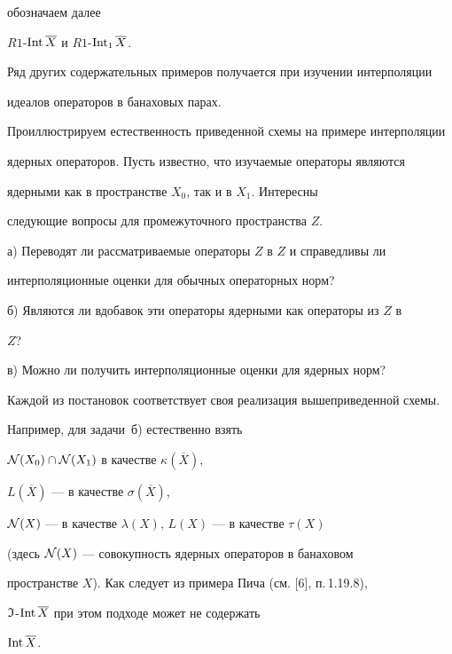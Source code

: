 обозначаем далее 


$R1$-$\operatorname{Int}\overline X$ и $R1$-$\operatorname{Int}_1 \overline X$.





Ряд других содержательных примеров получается при изучении интерполяции 


идеалов операторов в банаховых парах.


Проиллюстрируем естественность приведенной схемы на примере интерполяции 


ядерных операторов. Пусть известно, что изучаемые операторы являются 


ядерными как в пространстве $X_0$, так и в $X_1$. Интересны


следующие вопросы для промежуточного пространства $Z$.





а) Переводят ли рассматриваемые операторы $Z$ в $Z$ и справедливы ли 


интерполяционные оценки для обычных операторных норм?





б) Являются ли вдобавок эти операторы ядерными как операторы из $Z$ в 


$Z$?





в) Можно ли получить интерполяционные оценки для ядерных норм?





Каждой из постановок соответствует своя реализация вышеприведенной схемы. 


Например, для задачи~б) естественно взять 


${\cal N}(X_0) \cap {\cal N}(X_1)$ в качестве $\kappa (\overline X)$, 


$L(\overline X)$ --- в качестве $\sigma (\overline X)$, 


${\cal N}(X)$ --- в качестве $\lambda (X)$, $L(X)$ --- в качестве $\tau (X)$ 


(здесь ${\cal N}(X)$ --- совокупность ядерных операторов в банаховом 


пространстве $X$). Как следует из примера Пича (см. [6], п.\,1.19.8), 


$\frak I$-$\operatorname{Int}\overline X$ при этом подходе может не содержать 


$\operatorname{Int}\overline X$.





